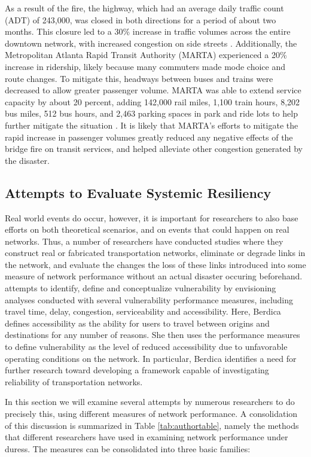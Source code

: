 As a result of the fire, the highway, which had an average daily traffic
count (ADT) of 243,000,
was closed in both directions for a period of about two months. This
closure led to a 30\%
increase in traffic volumes across the entire downtown network, with
increased congestion on side
streets \citep{hamedi2018}. Additionally, the Metropolitan Atlanta Rapid
Transit Authority
(MARTA) experienced a 20\% increase in ridership, likely because many
commuters made mode choice
and route changes. To mitigate this, headways between buses and trains
were decreased to allow
greater passenger volume. MARTA was able to extend service capacity by about 20 percent, adding 142,000 rail miles, 1,100
train hours, 8,202 bus
miles, 512 bus hours, and 2,463 parking spaces in park and ride lots to
help further mitigate the
situation \citep{marta2017, marta2018}. It is likely that MARTA’s efforts
to mitigate the rapid increase in passenger
volumes greatly reduced any negative effects of the bridge
fire on transit services, and helped alleviate other congestion generated by the disaster.

\subsection{Attempts to Evaluate Systemic Resiliency}

Real world events do occur, however, it is important for researchers to also base efforts on both theoretical scenarios, and on events that could happen on real networks. Thus, a number of researchers have conducted studies where they construct real
or fabricated
transportation networks, eliminate or degrade links in the network, and
evaluate the changes the
loss of these links introduced into some measure of network performance without an actual disaster occuring beforehand.
\citet{berdica2002}
attempts
to identify, define and conceptualize vulnerability by envisioning
analyses conducted with
several vulnerability performance measures, including travel time, delay,
congestion,
serviceability and accessibility. Here, Berdica defines accessibility as
the ability for users to
travel between origins and destinations for any number of reasons. She
then uses the performance
measures to define vulnerability as the level of reduced accessibility due
to unfavorable
operating conditions on the network. In particular, Berdica identifies a
need for further
research toward developing a framework capable of investigating
reliability of transportation
networks.

In this section we will examine several attempts by numerous researchers
to do precisely this,
using different measures of network performance. A consolidation of this
discussion is summarized
in Table \ref{tab:authortable}, namely the methods that different researchers have
used in examining network
performance under duress. The measures can be consolidated into three
basic families:

